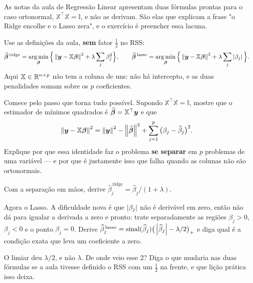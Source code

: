 As notas da aula de Regressão Linear apresentam duas fórmulas prontas para o caso ortonormal,
$\mathbb{X}^\top\mathbb{X}=\mathbb{I}$, e não as derivam. São elas que explicam a
frase "o Ridge encolhe e o Lasso zera", e o exercício é preencher essa lacuna.

Use as definições da aula, \textbf{sem} fator $\tfrac12$ no RSS:
\[
  \widehat{\bbeta}^{\,\text{ridge}}
   = \argmin_{\bbeta}\Big\{\norm{\bm y-\mathbb{X}\bbeta}^2+\lambda\sum_j\beta_j^2\Big\},
  \qquad
  \widehat{\bbeta}^{\,\text{lasso}}
   = \argmin_{\bbeta}\Big\{\norm{\bm y-\mathbb{X}\bbeta}^2+\lambda\sum_j\abs{\beta_j}\Big\}.
\]
Aqui $\mathbb{X}\in\mathbb{R}^{n\times p}$ não tem a coluna de uns: não há intercepto, e as
duas penalidades somam sobre os $p$ coeficientes.
\begin{itens}
  \item {} Comece pelo passo que torna tudo possível. Supondo
        $\mathbb{X}^\top\mathbb{X}=\mathbb{I}$, mostre que o estimador de mínimos
        quadrados é $\widehat{\bm{\beta}}=\mathbb{X}^\top\bm y$ e que
        \[
          \left\lVert \bm y-\mathbb{X}\bm{\beta} \right\rVert^2
            = \left\lVert \bm y \right\rVert^2-\left\lVert \widehat{\bm{\beta}} \right\rVert^2
              + \sum_{j=1}^{p}\big(\beta_j-\widehat\beta_j\big)^2 .
        \]
        Explique por que essa identidade faz o problema \textbf{se separar} em $p$
        problemas de uma variável --- e por que é justamente isso que falha quando
        as colunas não são ortonormais.
  \item {} Com a separação em mãos, derive
        $\widehat\beta_j^{\,\text{ridge}}=\widehat\beta_j/(1+\lambda)$.
  \item {} Agora o Lasso. A dificuldade nova é que $\left\lvert \beta_j \right\rvert$ não é
        derivável em zero, então não dá para igualar a derivada a zero e pronto:
        trate separadamente as regiões $\beta_j>0$, $\beta_j<0$ e o ponto
        $\beta_j=0$. Derive
        $\widehat\beta_j^{\,\text{lasso}}
          =\operatorname{sinal}(\widehat\beta_j)\big(\left\lvert \widehat\beta_j \right\rvert-\lambda/2\big)_+$
        e diga qual é a condição exata que leva um coeficiente a zero.
  \item {} O limiar deu $\lambda/2$, e não $\lambda$. De onde veio esse
        $2$? Diga o que mudaria nas duas fórmulas se a aula tivesse definido o RSS
        com um $\tfrac12$ na frente, e que lição prática isso deixa.
\end{itens}

